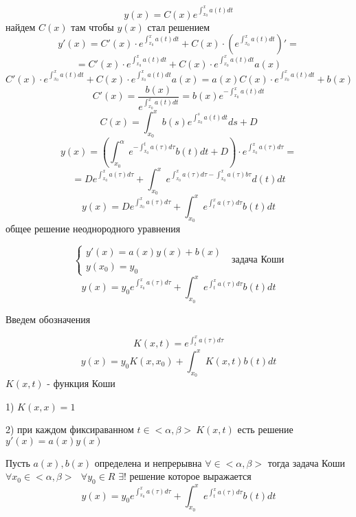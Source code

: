 \begin{block}
  $$
  y(x) = C(x) e^{\int_{x_0}^x a(t) dt}
  $$
  найдем $C(x)$ там чтобы $y(x)$ стал решением
  $$
  y'(x) = C'(x) \cdot e^{\int_{x_0}^x a(t) dt} +
  C(x) \cdot \left( e^{\int_{x_0}^x a(t) dt} \right)' =
  $$
  $$
  = C'(x) \cdot e^{\int_{x_0}^x a(t) dt} +
  C(x) \cdot e^{\int_{x_0}^x a(t) dt} a(x)
  $$
  $$
  C'(x) \cdot e^{\int_{x_0}^x a(t) dt} +
  C(x) \cdot e^{\int_{x_0}^x a(t) dt} a(x) =
  a(x) C(x) \cdot e^{\int_{x_0}^x a(t) dt} + b(x)
  $$
  $$
  C'(x) = \frac{b(x)}{e^{\int_{x_0}^x a(t) dt}} =
  b(x) e^{-\int_{x_0}^x a(t) dt}
  $$
  $$
  C(x) = \int_{x_0}^x b(s) e^{\int_{x_0}^s a(t) dt} ds + D
  $$
  $$
  y(x) = \left( \int_{x_0}^{\alpha} e^{-\int_{x_0}^t a(\tau) d\tau}
  b(t)dt + D \right) \cdot e^{\int_{x_0}^x a(\tau) d\tau} =
  $$
  $$
  = D e^{\int_{x_0}^x a(\tau) d\tau} + \int_{x_0}^x
  e^{\int_{x_0}^x a(\tau) d\tau - \int_{x_0}^x a(\tau) b\tau} d(t)dt
  $$
  $$
  y(x) = D e^{\int_{x_0}^x a(\tau) d\tau} + \int_{x_0}^x
  e^{\int_{t}^x a(\tau) d\tau} b(t)dt
  $$
  общее решение неоднородного уравнения
\end{block}

\begin{block}
  $$
  \left\{
  \begin{array}{l}
    y'(x) = a(x)y(x) + b(x) \\
    y(x_0) = y_0
  \end{array}
  \right. ~~~ \text{задача Коши}
  $$
  $$
  y(x) = y_0 e^{\int_{x_0}^x a(\tau) d\tau} + \int_{x_0}^x
  e^{\int_{t}^x a(\tau) d\tau} b(t)dt
  $$

  Введем обозначения

  $$
  K(x, t) = e^{\int_t^x a(\tau) d\tau}
  $$
  $$
  y(x) = y_0 K(x, x_0) + \int_{x_0}^x K(x, t) b(t) dt
  $$
  $K(x, t)$ - функция Коши
\end{block}

\begin{block}[Свойства]
  1) $K(x, x) = 1$

  2) при каждом фиксираванном $t \in <\alpha, \beta> ~ K(x, t)$ есть решение
  $y'(x) = a(x)y(x)$
\end{block}

\begin{theorem}
  Пусть $a(x), b(x)$ определена и непрерывна $\forall \in <\alpha, \beta>$
  тогда задача Коши $\forall x_0 \in <\alpha, \beta> ~~~ \forall y_0 \in R$
  $\exists !$ решение которое выражается
  $$
  y(x) = y_0 e^{\int_{x_0}^x a(\tau) d\tau} + \int_{x_0}^x
  e^{\int_{t}^x a(\tau) d\tau} b(t)dt
  $$
\end{theorem}

